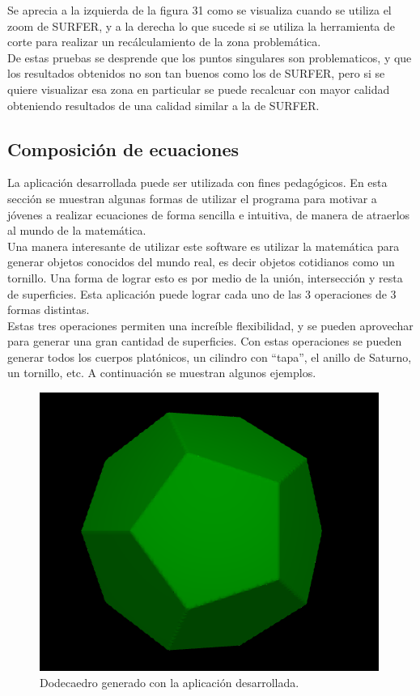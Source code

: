 \documentclass[12pt]{article}
\begin{document}
Se aprecia a la izquierda de la figura 31 como se visualiza cuando se utiliza el zoom de SURFER, y a la derecha lo que sucede si se utiliza la herramienta de corte para realizar un recálculamiento de la zona problemática. 
\\De estas pruebas se desprende que los puntos singulares son problematicos, y que los resultados obtenidos no son tan buenos como los de SURFER, pero si se quiere visualizar esa zona en particular se puede recalcuar con mayor calidad obteniendo resultados de una calidad similar a la de SURFER.

\subsection{Composición de ecuaciones}
La aplicación desarrollada puede ser utilizada con fines pedagógicos. En esta sección se muestran algunas formas de utilizar el programa para motivar a jóvenes a realizar ecuaciones de forma sencilla e intuitiva, de manera de atraerlos al mundo de la matemática.
\\Una manera interesante de utilizar este software es utilizar la matemática para generar objetos conocidos del mundo real, es decir objetos cotidianos como un tornillo. Una forma de lograr esto es por medio de la unión, intersección y resta de superficies. Esta aplicación puede lograr cada uno de las 3 operaciones de 3 formas distintas.
\\Estas tres operaciones permiten una increíble flexibilidad, y se pueden aprovechar para generar una gran cantidad de superficies. Con estas operaciones se pueden generar todos los cuerpos platónicos, un cilindro con “tapa”, el anillo de Saturno, un tornillo, etc. A continuación se muestran algunos ejemplos.\\
\begin{figure}
\includegraphics[width=0.9\linewidth]{dodecaedro.png} 
\caption{Dodecaedro generado con la aplicación desarrollada.}
\label{fig:subim1}
\end{figure}
\end{document}
